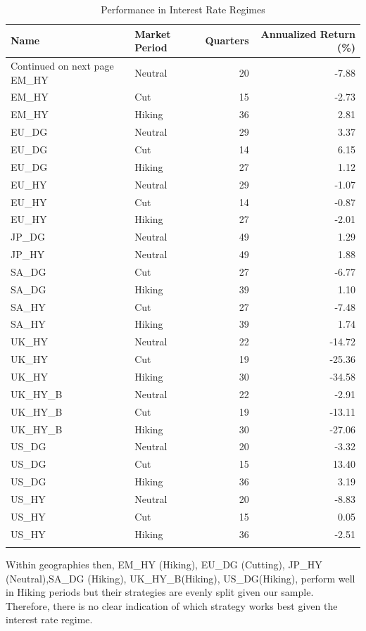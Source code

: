 \documentclass[12pt,preprint, authoryear]{elsarticle}
\numberwithin{equation}{section}
\numberwithin{figure}{section}
\numberwithin{table}{section}
\begin{document}
\begingroup\fontsize{12pt}{13pt}\selectfont
\begin{longtable}{llrr}
  \toprule
Name & Market Period & Quarters & Annualized Return (\%) \\ 
  \hline 
\endhead 
\hline 
{\footnotesize Continued on next page} 
\endfoot 
\endlastfoot 
 \midrule
EM\_HY & Neutral &  20 & -7.88 \\ 
  EM\_HY & Cut &  15 & -2.73 \\ 
  EM\_HY & Hiking &  36 & 2.81 \\ 
  EU\_DG & Neutral &  29 & 3.37 \\ 
  EU\_DG & Cut &  14 & 6.15 \\ 
  EU\_DG & Hiking &  27 & 1.12 \\ 
  EU\_HY & Neutral &  29 & -1.07 \\ 
  EU\_HY & Cut &  14 & -0.87 \\ 
  EU\_HY & Hiking &  27 & -2.01 \\ 
  JP\_DG & Neutral &  49 & 1.29 \\ 
  JP\_HY & Neutral &  49 & 1.88 \\ 
  SA\_DG & Cut &  27 & -6.77 \\ 
  SA\_DG & Hiking &  39 & 1.10 \\ 
  SA\_HY & Cut &  27 & -7.48 \\ 
  SA\_HY & Hiking &  39 & 1.74 \\ 
  UK\_HY & Neutral &  22 & -14.72 \\ 
  UK\_HY & Cut &  19 & -25.36 \\ 
  UK\_HY & Hiking &  30 & -34.58 \\ 
  UK\_HY\_B & Neutral &  22 & -2.91 \\ 
  UK\_HY\_B & Cut &  19 & -13.11 \\ 
  UK\_HY\_B & Hiking &  30 & -27.06 \\ 
  US\_DG & Neutral &  20 & -3.32 \\ 
  US\_DG & Cut &  15 & 13.40 \\ 
  US\_DG & Hiking &  36 & 3.19 \\ 
  US\_HY & Neutral &  20 & -8.83 \\ 
  US\_HY & Cut &  15 & 0.05 \\ 
  US\_HY & Hiking &  36 & -2.51 \\ 
   \bottomrule
\caption{Performance in Interest Rate Regimes\label{tab3}} 
\end{longtable}
\endgroup

Within geographies then, EM\_HY (Hiking), EU\_DG (Cutting), JP\_HY
(Neutral),SA\_DG (Hiking), UK\_HY\_B(Hiking), US\_DG(Hiking), perform
well in Hiking periods but their strategies are evenly split given our
sample. Therefore, there is no clear indication of which strategy works
best given the interest rate regime.
\end{document}
